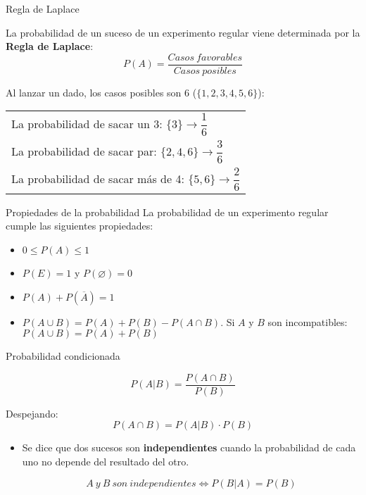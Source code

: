 \documentclass[11pt]{beamer}
\begin{document}
\begin{frame}{Regla de Laplace}
\begin{block}{}
 La probabilidad de un suceso de un experimento regular viene determinada por la \textbf{Regla de Laplace}:
$$P(A)=\dfrac{Casos\ favorables}{Casos\ posibles} $$
\end{block}

Al lanzar un dado, los casos posibles son 6 ($\lbrace1,2,3,4,5,6\rbrace$):\\
\begin{tabular}{l}
La probabilidad de sacar un 3: $\lbrace3\rbrace\to \dfrac{1}{6}$\\
La probabilidad de sacar par: $\lbrace2,4,6\rbrace\to\dfrac{3}{6}$ \\
La probabilidad de sacar más de 4: $\lbrace5,6\rbrace\to\dfrac{2}{6}$
\end{tabular}

\end{frame}

\begin{frame}{Propiedades de la probabilidad} La probabilidad de un experimento regular cumple las siguientes propiedades:
\begin{itemize}
\item $0 \leq P(A) \leq 1$ 
\item $P(E) = 1$ y $P(\varnothing) = 0$
\item $P(A) + P(\overline A) = 1$
\item $P(A \cup B) = P(A) + P(B) - P(A \cap B)$. Si $A$ y $B$ son incompatibles: $P(A \cup B) = P(A) + P(B)$
\end{itemize}
\end{frame}


\begin{frame}{Probabilidad condicionada}
\begin{block}{}
$$P(A|B)=\dfrac{P(A\cap B)}{P(B)}$$
\end{block}
Despejando:
$$P(A\cap B) = P(A|B)\cdot P(B)$$

\begin{itemize}
\item Se dice que dos sucesos son \textbf{independientes} cuando la probabilidad de cada uno no depende del resultado del otro. 

$$A\ y \ B\ son \ independientes \Longleftrightarrow P(B|A)=P(B)$$

\end{itemize}
\end{frame}
\end{document}
